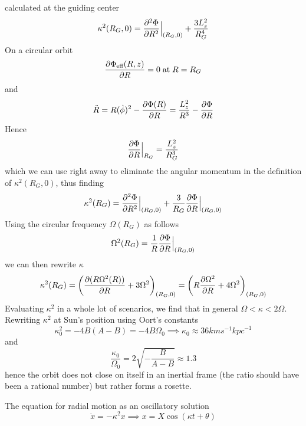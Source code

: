 calculated at the guiding center
\begin{equation*}
    \kappa^{2}(R_{G},0) = \frac{\partial^{2} \Phi}{\partial R^{2}}\Big|_{(R_{G},0)} + \frac{3L_{z}^{2}}{R_{G}^{4}}
\end{equation*}
On a circular orbit
\begin{equation*}
    \frac{\partial \Phi_{\text{eff}}(R,z)}{\partial R} = 0 \;\text{at}\; R = R_{G}
\end{equation*}
and
\begin{equation*}
    \ddot{R} = R(\dot{\phi})^{2}-\frac{\partial \Phi(R)}{\partial R} = \frac{L_{z}^{2}}{R^{3}}-\frac{\partial \Phi}{\partial R}
\end{equation*}
Hence 
\begin{equation}
    \frac{\partial \Phi}{\partial R}\Big|_{R_{G}} = \frac{L_{z}^{2}}{R_{G}^{3}}
    \label{eq:masked_centaccel}
\end{equation}
which we can use right away to eliminate the angular momentum in the definition of $\kappa^{2}(R_{G},0)$, thus finding
\begin{equation*}
    \kappa^{2}(R_{G}) = \frac{\partial^{2} \Phi}{\partial R^{2}}\Big|_{(R_{G},0)}+\frac{3}{R_{G}}\frac{\partial \Phi}{\partial R}\Big|_{(R_{G},0)}
\end{equation*}
Using the circular frequency $\Omega(R_{G})$ as follows
\begin{equation*}
    \Omega^{2}(R_{G}) = \frac{1}{R}\frac{\partial \Phi}{\partial R}\Big|_{(R_{G},0)}
\end{equation*}
we can then rewrite $\kappa$
\begin{equation}
    \kappa^{2}(R_{G}) = \left(\frac{\partial (R\Omega^{2}(R))}{\partial R}+3\Omega^{2}\right)_{(R_{G},0)} = \left(R\frac{\partial \Omega^{2}}{\partial R}+4\Omega^{2}\right)_{(R_{G},0)}
\end{equation}
Evaluating $\kappa^{2}$ in a whole lot of scenarios, we find that in general $\Omega < \kappa < 2\Omega$. Rewriting $\kappa^{2}$ at Sun's position using Oort's constants
\begin{equation*}
    \kappa^{2}_{0} = -4B(A-B) = -4B\Omega_{0} \implies \kappa_{0} \approx 36 \unit{km}\unit{s}^{-1}\unit{kpc}^{-1}
\end{equation*}
and 
\begin{equation*}
    \frac{\kappa_{0}}{\Omega_{0}}  = 2\sqrt{-\frac{B}{A-B}} \approx 1.3
\end{equation*}
hence the orbit does not close on itself in an inertial frame (the ratio should have been a rational number) but rather forms a rosette.
\par The equation for radial motion as an oscillatory solution
\begin{equation*}
    \ddot{x} = -\kappa^{2}x \implies x = X\cos(\kappa t + \theta)
\end{equation*}
